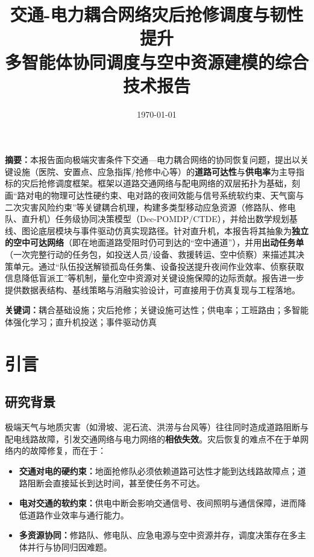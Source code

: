\documentclass[UTF8,zihao=-4,a4paper,fontset=fandol]{ctexrep}
\title{\vspace{-1.2cm}\textbf{交通-电力耦合网络灾后抢修调度与韧性提升\\\large 多智能体协同调度与空中资源建模的综合技术报告}}
\author{\vspace{-0.2cm}}
\date{\today}
\begin{document}
\setlength{\headheight}{16pt}
\maketitle

\begin{center}
\vspace{-0.2cm}
\begin{minipage}{0.92\textwidth}
\small
\textbf{摘要：}本报告面向极端灾害条件下交通—电力耦合网络的协同恢复问题，提出以关键设施（医院、安置点、应急指挥/抢修中心等）的\textbf{道路可达性}与\textbf{供电率}为主导指标的灾后抢修调度框架。框架以道路交通网络与配电网络的双层拓扑为基础，刻画“路对电的物理可达性硬约束、电对路的夜间效能与信号系统软约束、天气窗与二次灾害风险约束”等关键耦合机理，构建多类型移动应急资源（修路队、修电队、直升机）任务级协同决策模型（Dec-POMDP/CTDE），并给出数学规划基线、图论底层模块与事件驱动仿真实现路径。针对直升机，本报告将其抽象为\textbf{独立的空中可达网络}（即在地面道路受阻时仍可到达的“空中通道”），并用\textbf{出动任务单}（一次完整行动的任务包，如投送人员/设备、救援转运、空中侦察）来描述其决策单元。通过“队伍投送解锁孤岛任务集、设备投送提升夜间作业效率、侦察获取信息降低盲派工”等机制，量化空中资源对关键设施保障的边际贡献。报告进一步提供数据表结构、基线策略与消融实验设计，可直接用于仿真复现与工程落地。

\textbf{关键词：}耦合基础设施；灾后抢修；关键设施可达性；供电率；工班路由；多智能体强化学习；直升机投送；事件驱动仿真
\end{minipage}
\end{center}

\tableofcontents
\listoffigures
\listoftables
\clearpage
{}

\chapter{引言}
\section{研究背景}
极端天气与地质灾害（如滑坡、泥石流、洪涝与台风等）往往同时造成道路阻断与配电线路故障，引发交通网络与电力网络的\textbf{相依失效}。灾后恢复的难点不在于单网络内的故障修复，而在于：
\begin{itemize}[leftmargin=2em]
  \item \textbf{交通对电的硬约束：}地面抢修队必须依赖道路可达性才能到达线路故障点；道路阻断会直接延长到达时间，甚至使任务不可达。
  \item \textbf{电对交通的软约束：}供电中断会影响交通信号、夜间照明与通信保障，进而降低道路作业效率与通行能力。
  \item \textbf{多资源协同：}修路队、修电队、应急电源与空中资源并存，调度决策存在多主体并行与协同归因难题。
\end{itemize}
\end{document}
